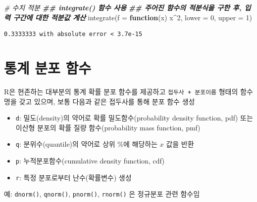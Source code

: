 \documentclass[
  11pt,
]{krantz}
\makeatletter
\newenvironment{Shaded}{\begin{snugshade}}{\end{snugshade}}
\newcommand{\AttributeTok}[1]{\textcolor[rgb]{0.61,0.61,0.61}{#1}}
\newcommand{\CommentTok}[1]{\textcolor[rgb]{0.37,0.37,0.37}{\textit{#1}}}
\newcommand{\ControlFlowTok}[1]{\textcolor[rgb]{0.27,0.27,0.27}{\textbf{#1}}}
\newcommand{\DecValTok}[1]{\textcolor[rgb]{0.06,0.06,0.06}{#1}}
\newcommand{\DocumentationTok}[1]{\textcolor[rgb]{0.37,0.37,0.37}{\textbf{\textit{#1}}}}
\newcommand{\FunctionTok}[1]{\textcolor[rgb]{0,0,0}{#1}}
\newcommand{\NormalTok}[1]{#1}
\newcommand{\SpecialCharTok}[1]{\textcolor[rgb]{0,0,0}{#1}}
\providecommand{\tightlist}{%
  \setlength{\itemsep}{0pt}\setlength{\parskip}{0pt}}
\newenvironment{kframe}{%
\medskip{}
\setlength{\fboxsep}{.8em}
 \def\at@end@of@kframe{}%
 \ifinner\ifhmode%
  \def\at@end@of@kframe{\end{minipage}}%
  \begin{minipage}{\columnwidth}%
 \fi\fi%
 \def\FrameCommand##1{\hskip\@totalleftmargin \hskip-\fboxsep
 \colorbox{shadecolor}{##1}\hskip-\fboxsep
     \hskip-\linewidth \hskip-\@totalleftmargin \hskip\columnwidth}%
 \MakeFramed {\advance\hsize-\width
   \@totalleftmargin\z@ \linewidth\hsize
   \@setminipage}}%
 {\par\unskip\endMakeFramed%
 \at@end@of@kframe}
\renewenvironment{quote}{\begin{kframe}}{\end{kframe}}
\makeatother
\begin{document}
\begin{Shaded}
\begin{Highlighting}[]
\CommentTok{\# 수치 적분}
\DocumentationTok{\#\# integrate() 함수 사용}
\DocumentationTok{\#\# 주어진 함수의 적분식을 구한 후, 입력 구간에 대한 적분값 계산}
\FunctionTok{integrate}\NormalTok{(}\AttributeTok{f =} \ControlFlowTok{function}\NormalTok{(x) x}\SpecialCharTok{\^{}}\DecValTok{2}\NormalTok{, }\AttributeTok{lower =} \DecValTok{0}\NormalTok{, }\AttributeTok{upper =} \DecValTok{1}\NormalTok{)}
\end{Highlighting}
\end{Shaded}

\begin{verbatim}
0.3333333 with absolute error < 3.7e-15
\end{verbatim}

\normalsize

\hypertarget{uxd1b5uxacc4-uxbd84uxd3ec-uxd568uxc218}{%
\section{통계 분포 함수}\label{uxd1b5uxacc4-uxbd84uxd3ec-uxd568uxc218}}

R은 현존하는 대부분의 통계 확률 분포 함수를 제공하고 \texttt{접두사\ +\ 분포이름} 형태의 함수명을 갖고 있으며, 보통 다음과 같은 접두사를 통해 분포 함수 생성

\begin{itemize}
\tightlist
\item
  \texttt{d}: 밀도(density)의 약어로 확률 밀도함수(probability density function, pdf) 또는 이산형 분포의 확률 질량 함수(probability mass function, pmf)
\item
  \texttt{q}: 분위수(quantile)의 약어로 상위 \%에 해당하는 \(x\) 값을 반환
\item
  \texttt{p}: 누적분포함수(cumulative density function, cdf)
\item
  \texttt{r}: 특정 분포로부터 난수(확률변수) 생성
\end{itemize}

\begin{quote}
예: \texttt{dnorm()}, \texttt{qnorm()}, \texttt{pnorm()}, \texttt{rnorm()} 은 정규분포 관련 함수임
\end{quote}

\footnotesize
\end{document}
